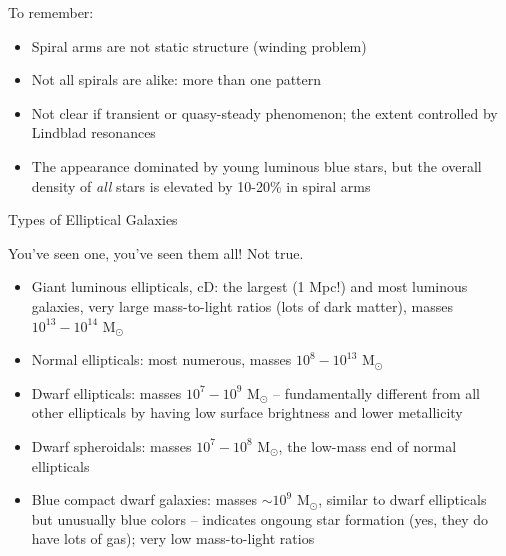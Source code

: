 \documentclass[letterpaper,landscape]{slides}
\begin{document}
\begin{slide}
\begin{center}
{\color{red} To remember:}
\end{center}

\begin{itemize}
\item
Spiral arms are not static structure (winding problem)
\item
Not all spirals are alike: more than one pattern
\item
Not clear if transient or quasy-steady phenomenon; 
the extent controlled by Lindblad resonances 
\item 
The appearance dominated by young luminous blue stars, but
the overall density of {\it all} stars is elevated by
10-20\% in spiral arms 
\end{itemize}

\vfill
\end{slide}



\begin{slide}
\begin{center}
{\color{red} Types of Elliptical Galaxies}
\end{center}


{\color{blue} You've seen one, you've seen them all!} {\color{red} Not true.}


\begin{itemize}
\item {\color{blue}Giant luminous ellipticals, cD:} the largest (1 Mpc!) and most luminous galaxies,
      very large mass-to-light ratios (lots of dark matter), masses $10^{13}-10^{14}$ M$_\odot$
\item {\color{blue}Normal ellipticals:} most numerous, masses $10^{8}-10^{13}$ M$_\odot$
\item {\color{blue}Dwarf ellipticals:} masses $10^{7}-10^{9}$ M$_\odot$ -- fundamentally different from all 
 other ellipticals by having low surface brightness and lower metallicity
\item {\color{blue}Dwarf spheroidals:} masses $10^{7}-10^{8}$ M$_\odot$, the low-mass end of normal ellipticals
\item {\color{blue}Blue compact dwarf galaxies:} masses $\sim10^{9}$ M$_\odot$, similar to dwarf ellipticals
     but unusually blue colors -- indicates ongoung star formation (yes, they do have lots of
     gas); very low mass-to-light ratios
\end{itemize}



\vfill
\end{slide}
\end{document}
